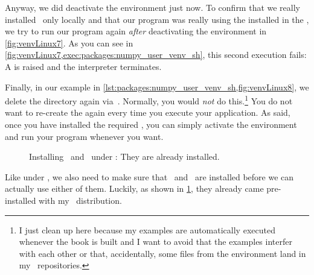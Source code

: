 Anyway, we did deactivate the environment just now.
To confirm that we really installed \numpy\ only locally and that our program was really using the  installed in the , we try to run our program again \emph{after} deactivating the environment in \cref{fig:venvLinux7}.
As you can see in \cref{fig:venvLinux7,exec:packages:numpy_user_venv_sh}, this second execution fails:
A  is raised and the interpreter terminates.%
%
\begin{sloppypar}%
Finally, in our example in \cref{lst:packages:numpy_user_venv_sh,fig:venvLinux8}, we delete the  directory again via~.
Normally, you would \emph{not} do this.\footnote{%
I just clean up here because my examples are automatically executed whenever the book is built and I want to avoid that the examples interfer with each other or that, accidentally, some files from the environment land in my \git\ repositories.}
You do not want to re-create the  again every time you execute your application.
As said, once you have installed the required , you can simply activate the environment and run your program whenever you want.%
\end{sloppypar}%
%
\FloatBarrier%
\endhsection%
%
%
%
\begin{figure}%
\centering%
%
\caption{Installing \pip\ and \venv\ under \microsoftWindows: They are already installed.}%
\label{fig:installPipVenvWindows}%
\end{figure}%
%
Like under \linux, we also need to make sure that \pip\ and \venv\ are installed before we can actually use either of them.
Luckily, as shown in \cref{fig:installPipVenvWindows}, they already came pre-installed with my \python\ distribution.

